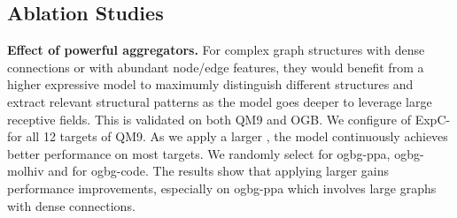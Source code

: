\documentclass{article} \usepackage{iclr2021_conference,times}
\begin{document}
\begin{table}[h]
\centering
\caption{Ablation studies on QM9. Lower is better.}\smallskip
{}
\label{qm9-ablation}
\end{table}

\subsection{Ablation Studies}
\textbf{Effect of powerful aggregators.}
For complex graph structures with dense connections or with abundant node/edge features,
they would benefit from a higher expressive model to maximumly distinguish different structures and extract relevant structural patterns as the model goes deeper to leverage large receptive fields.
This is validated on both QM9 and OGB.
We configure  of ExpC- for all 12 targets of QM9.
As we apply a larger ,
the model continuously achieves better performance on most targets.
We randomly select  for ogbg-ppa, ogbg-molhiv and  for ogbg-code.
The results show that applying larger  gains performance improvements,
especially on ogbg-ppa which involves large graphs with dense connections.
\end{document}
